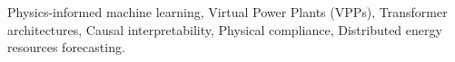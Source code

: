 \begin{IEEEkeywords}
Physics-informed machine learning, Virtual Power Plants (VPPs), Transformer architectures, Causal interpretability, Physical compliance, Distributed energy resources forecasting.
\end{IEEEkeywords}
